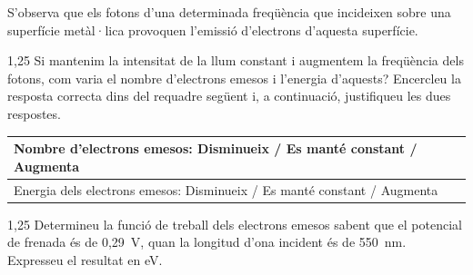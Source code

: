 S'observa que els fotons d'una determinada freqüència que incideixen sobre una superfície metàl·lica provoquen l'emissió d'electrons d'aquesta superfície.

\begin{apartat}{1,25}
Si mantenim la intensitat de la llum constant i augmentem la freqüència dels fotons, com varia el nombre d'electrons emesos i l'energia d'aquests? Encercleu la resposta correcta dins del requadre següent i, a continuació, justifiqueu les dues respostes.

\begin{center}
\begin{tabular}{l}
\toprule
Nombre d'electrons emesos: Disminueix / Es manté constant / Augmenta \\
\midrule
Energia dels electrons emesos: Disminueix / Es manté constant / Augmenta \\
\bottomrule
\end{tabular}
\end{center}
\end{apartat}

\begin{apartat}{1,25}
Determineu la funció de treball dels electrons emesos sabent que el potencial de frenada és de 0,29~V, quan la longitud d'ona incident és de 550~nm. Expresseu el resultat en eV.
\end{apartat}

